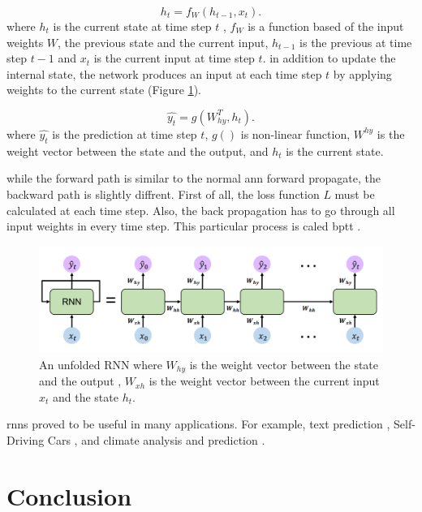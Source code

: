 \documentclass[runningheads]{llncs}
\begin{document}
\begin{equation}
    \label{rnn}
    h_{t} = f_{W}(h_{t-1}, x_{t}).
\end{equation}
where $h_{t}$ is the current state at time step $t$ , $f_{W}$ is a function
based of the input weights $W$, the previous state and the current input,  
$h_{t-1}$ is the previous at time step $t-1$ and $x_{t}$ is the current input at time step $t$. in addition to update the internal state, the network produces an input at each
time step $t$ by applying weights to the current state (Figure \ref{rnnf}).

\begin{equation}
    \label{rnny}
    \hat{y_{t}} = g(W^T_{hy}, h_{t}).
\end{equation}
where $\hat{y_{t}}$ is the prediction at time step $t$, $g()$ is non-linear function,
$W^{hy}$ is the weight vector between the state and the output, and $h_{t}$ is the current state.


while the forward path is similar to the normal \gls{ann} forward propagate, 
the backward path is slightly diffrent. First of all, the loss function $L$ must be calculated
at each time step. Also, the back propagation has to go through all input weights in 
every time step. This particular process is caled \gls{bptt} \cite{werbos1990backpropagation}.

\begin{figure}[H]
    \label{rnnf}
    \centering
    \includegraphics[height=3.5cm]{rnn}
    \caption{An unfolded RNN where $W_{hy}$ is the weight vector between the state and the output 
    , $W_{xh}$ is the weight vector between the current input $x_{t}$ and the state $h_{t}$.}
\end{figure}

\gls{rnns} proved to be useful in many applications. For example, 
text prediction \cite{jagannatha2016structured}, Self-Driving Cars \cite{gu2020lstm}, and climate analysis and prediction \cite{earthnet}.


\section{Conclusion}
\end{document}
